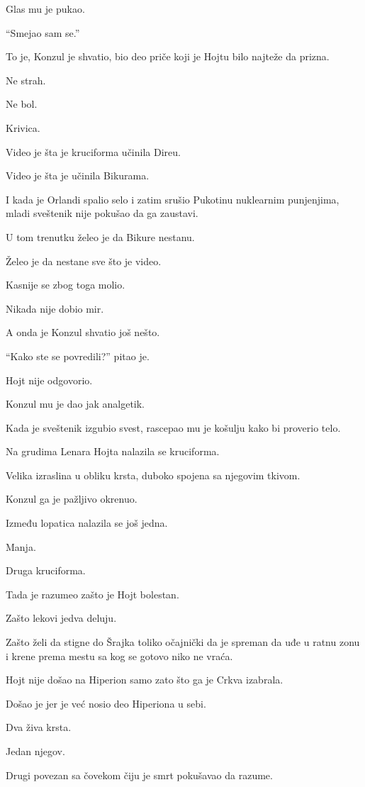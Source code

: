 Glas mu je pukao.

``Smejao sam se.''

To je, Konzul je shvatio, bio deo priče koji je Hojtu bilo najteže da prizna.

Ne strah.

Ne bol.

Krivica.

Video je šta je kruciforma učinila Direu.

Video je šta je učinila Bikurama.

I kada je Orlandi spalio selo i zatim srušio Pukotinu nuklearnim punjenjima, mladi sveštenik nije pokušao da ga zaustavi.

U tom trenutku želeo je da Bikure nestanu.

Želeo je da nestane sve što je video.

Kasnije se zbog toga molio.

Nikada nije dobio mir.

A onda je Konzul shvatio još nešto.

``Kako ste se povredili?'' pitao je.

Hojt nije odgovorio.

Konzul mu je dao jak analgetik.

Kada je sveštenik izgubio svest, rascepao mu je košulju kako bi proverio telo.

Na grudima Lenara Hojta nalazila se kruciforma.

Velika izraslina u obliku krsta, duboko spojena sa njegovim tkivom.

Konzul ga je pažljivo okrenuo.

Između lopatica nalazila se još jedna.

Manja.

Druga kruciforma.

Tada je razumeo zašto je Hojt bolestan.

Zašto lekovi jedva deluju.

Zašto želi da stigne do Šrajka toliko očajnički da je spreman da uđe u ratnu zonu i krene prema mestu sa kog se gotovo niko ne vraća.

Hojt nije došao na Hiperion samo zato što ga je Crkva izabrala.

Došao je jer je već nosio deo Hiperiona u sebi.

Dva živa krsta.

Jedan njegov.

Drugi povezan sa čovekom čiju je smrt pokušavao da razume.

